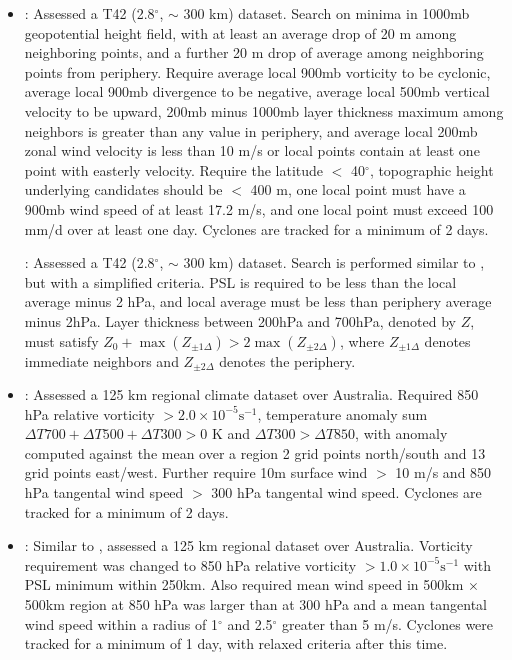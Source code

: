 \documentclass[gmdd, hvmath, online]{copernicus_discussions}
\begin{document}
\begin{itemize}
\item \cite{tsutsui1996simulated}:  Assessed a T42 (2.8$^\circ$, $\sim$ 300 km) dataset.  Search on minima in 1000mb geopotential height field, with at least an average drop of 20 m among neighboring points, and a further 20 m drop of average among neighboring points from periphery.  Require average local 900mb vorticity to be cyclonic, average local 900mb divergence to be negative, average local 500mb vertical velocity to be upward, 200mb minus 1000mb layer thickness maximum among neighbors is greater than any value in periphery, and average local 200mb zonal wind velocity is less than 10 m/s or local points contain at least one point with easterly velocity.  Require the latitude $<$ 40$^\circ$, topographic height underlying candidates should be $<$ 400 m, one local point must have a 900mb wind speed of at least 17.2 m/s, and one local point must exceed 100 mm/d over at least one day.  Cyclones are tracked for a minimum of 2 days.

\cite{tsutsui2002implications}:  Assessed a T42 (2.8$^\circ$, $\sim$ 300 km) dataset.  Search is performed similar to \cite{tsutsui1996simulated}, but with a simplified criteria.  PSL is required to be less than the local average minus 2 hPa, and local average must be less than periphery average minus 2hPa.  Layer thickness between 200hPa and 700hPa, denoted by $Z$, must satisfy $Z_0 + \max(Z_{\pm 1 \Delta}) > 2 \max(Z_{\pm 2 \Delta})$, where $Z_{\pm 1 \Delta}$ denotes immediate neighbors and $Z_{\pm 2 \Delta}$ denotes the periphery.

\item \cite{walsh1997objective, walsh1997tropical, walsh2000impact}:  Assessed a 125 km regional climate dataset over Australia.  Required 850 hPa relative vorticity $> 2.0 \times 10^{-5} \mbox{s}^{-1}$, temperature anomaly sum $\Delta T700+ \Delta T500+ \Delta T300 > 0$ K and $\Delta T300 > \Delta T850$, with anomaly computed against the mean over a region 2 grid points north/south and 13 grid points east/west.  Further require 10m surface wind $>$ 10 m/s and 850 hPa tangental wind speed $>$ 300 hPa tangental wind speed.  Cyclones are tracked for a minimum of 2 days.

\item \cite{nguyen2001interannual}:  Similar to \cite{walsh1997tropical}, assessed a 125 km regional dataset over Australia.  Vorticity requirement was changed to 850 hPa relative vorticity $> 1.0 \times 10^{-5} \mbox{s}^{-1}$ with PSL minimum within 250km.  Also required mean wind speed in 500km $\times$ 500km region at 850 hPa was larger than at 300 hPa and a mean tangental wind speed within a radius of 1$^\circ$ and 2.5$^\circ$ greater than 5 m/s.  Cyclones were tracked for a minimum of 1 day, with relaxed criteria after this time.


\end{itemize}
\end{document}
